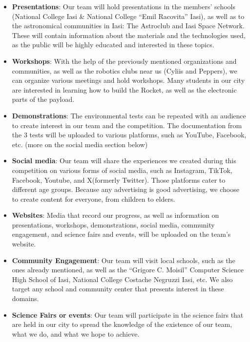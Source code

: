 \begin{itemize}

\item \textbf{Presentations}: Our team will hold presentations in the members’ schools (National College Iasi \& National College “Emil Racovita” Iasi), as well as to the astronomical communities in Iasi: The Astroclub and Iasi Space Network. These will contain information about the materials and the technologies used, as the public will be highly educated and interested in these topics.
\item \textbf{Workshops}: With the help of the previously mentioned organizations and communities, as well as the robotics clubs near us (Cyliis and Peppers), we can organize various meetings and hold workshops. Many students in our city are interested in learning how to build the Rocket, as well as the electronic parts of the payload.
\item \textbf{Demonstrations}: The environmental tests can be repeated with an audience to create interest in our team and the competition. The documentation from the 3 tests will be uploaded to various platforms, such as YouTube, Facebook, etc. (more on the social media section below)
\item \textbf{Social media}: Our team will share the experiences we created during this competition on various forms of social media, such as Instagram, TikTok, Facebook, Youtube, and X(formerly Twitter). Those platforms cater to different age groups. Because any advertising is good advertising, we choose to create content for everyone, from children to elders.
\item \textbf{Websites}: Media that record our progress, as well as information on presentations, workshops, demonstrations, social media, community engagement, and science fairs and events, will be uploaded on the team’s website.
\item \textbf{Community Engagement}: Our team will visit local schools, such as the ones already mentioned, as well as the “Grigore C. Moisil” Computer Science High School of Iasi, National College Costache Negruzzi Iasi, etc. We also target any school and community center that presents interest in these domains. 
\item \textbf{Science Fairs or events}: Our team will participate in the science fairs that are held in our city to spread the knowledge of the existence of our team, what we do, and what we hope to achieve. 

\end{itemize}